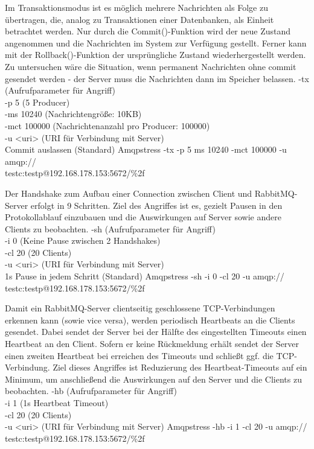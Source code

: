 \documentclass[	a4paper,
			11pt,
			oneside,
			parskip]{scrartcl}
\begin{document}
		{%
		 Im Transaktionsmodus ist es möglich mehrere Nachrichten als Folge zu übertragen, die, analog zu Transaktionen einer Datenbanken, als Einheit betrachtet werden. Nur durch die Commit()-Funktion
		 wird der neue Zustand angenommen und die Nachrichten im System zur Verfügung gestellt. Ferner kann mit der Rollback()-Funktion der ursprüngliche Zustand wiederhergestellt werden.
		 Zu untersuchen wäre die Situation, wenn permanent Nachrichten ohne commit gesendet werden - der Server muss die Nachrichten dann im Speicher belassen.
		}{%
		 -tx (Aufrufparameter für Angriff) \\
		 -p 5 (5 Producer) \\
		 -ms 10240 (Nachrichtengröße: 10KB) \\
		 -mct 100000 (Nachrichtenanzahl pro Producer: 100000) \\
		 -u <uri> (URI für Verbindung mit Server) \\
		 Commit auslassen (Standard)
		}{%
		 Amqpstress -tx -p 5 ms 10240 -mct 100000 -u amqp://\\\hspace*{3cm}testc:testp@192.168.178.153:5672/\%2f
		}
	
	
		{%
		 Der Handshake zum Aufbau einer Connection zwischen Client und RabbitMQ-Server erfolgt in 9 Schritten. Ziel des Angriffes ist es, gezielt Pausen in den Protokollablauf einzubauen und die
		 Auswirkungen auf Server sowie andere Clients zu beobachten.
		}{%
		 -sh (Aufrufparameter für Angriff) \\
		 -i 0 (Keine Pause zwischen 2 Handshakes) \\
		 -cl 20 (20 Clients) \\
		 -u <uri> (URI für Verbindung mit Server) \\
		 1s Pause in jedem Schritt (Standard) 
		}{%
		 Amqpstress -sh -i 0 -cl 20 -u amqp://\\\hspace*{3cm}testc:testp@192.168.178.153:5672/\%2f
		}


		{%
		 Damit ein RabbitMQ-Server clientseitig geschlossene TCP-Verbindungen erkennen kann (sowie vice versa), werden periodisch Heartbeats an die Clients gesendet. Dabei sendet der Server bei der Hälfte des
		 eingestellten Timeouts einen Heartbeat an den Client. Sofern er keine Rückmeldung erhält sendet der Server einen zweiten Heartbeat bei erreichen des Timeouts und schließt ggf. die TCP-Verbindung. Ziel dieses Angriffes ist Reduzierung des Heartbeat-Timeouts auf ein Minimum, um anschließend die Auswirkungen auf den Server und die Clients zu beobachten. 
		}{%
		 -hb (Aufrufparameter für Angriff) \\
		 -i 1 (1s Heartbeat Timeout) \\
		 -cl 20 (20 Clients) \\
		 -u <uri> (URI für Verbindung mit Server)
		}{%
		 Amqpstress -hb -i 1 -cl 20 -u amqp://\\\hspace*{3cm} testc:testp@192.168.178.153:5672/\%2f
		}
\end{document}
